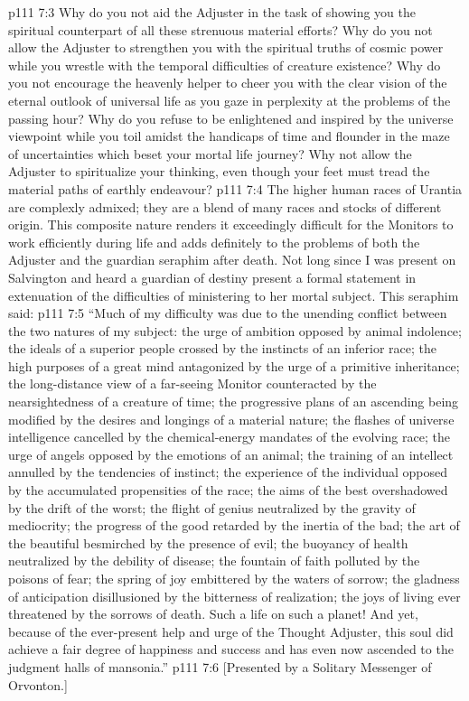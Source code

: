 \vs p111 7:3 Why do you not aid the Adjuster in the task of showing you the spiritual counterpart of all these strenuous material efforts? Why do you not allow the Adjuster to strengthen you with the spiritual truths of cosmic power while you wrestle with the temporal difficulties of creature existence? Why do you not encourage the heavenly helper to cheer you with the clear vision of the eternal outlook of universal life as you gaze in perplexity at the problems of the passing hour? Why do you refuse to be enlightened and inspired by the universe viewpoint while you toil amidst the handicaps of time and flounder in the maze of uncertainties which beset your mortal life journey? Why not allow the Adjuster to spiritualize your thinking, even though your feet must tread the material paths of earthly endeavour?
\vs p111 7:4 The higher human races of Urantia are complexly admixed; they are a blend of many races and stocks of different origin. This composite nature renders it exceedingly difficult for the Monitors to work efficiently during life and adds definitely to the problems of both the Adjuster and the guardian seraphim after death. Not long since I was present on Salvington and heard a guardian of destiny present a formal statement in extenuation of the difficulties of ministering to her mortal subject. This seraphim said:
\vs p111 7:5 \pc “Much of my difficulty was due to the unending conflict between the two natures of my subject: the urge of ambition opposed by animal indolence; the ideals of a superior people crossed by the instincts of an inferior race; the high purposes of a great mind antagonized by the urge of a primitive inheritance; the long\hyp{}distance view of a far\hyp{}seeing Monitor counteracted by the nearsightedness of a creature of time; the progressive plans of an ascending being modified by the desires and longings of a material nature; the flashes of universe intelligence cancelled by the chemical\hyp{}energy mandates of the evolving race; the urge of angels opposed by the emotions of an animal; the training of an intellect annulled by the tendencies of instinct; the experience of the individual opposed by the accumulated propensities of the race; the aims of the best overshadowed by the drift of the worst; the flight of genius neutralized by the gravity of mediocrity; the progress of the good retarded by the inertia of the bad; the art of the beautiful besmirched by the presence of evil; the buoyancy of health neutralized by the debility of disease; the fountain of faith polluted by the poisons of fear; the spring of joy embittered by the waters of sorrow; the gladness of anticipation disillusioned by the bitterness of realization; the joys of living ever threatened by the sorrows of death. Such a life on such a planet! And yet, because of the ever\hyp{}present help and urge of the Thought Adjuster, this soul did achieve a fair degree of happiness and success and has even now ascended to the judgment halls of mansonia.”
\vsetoff
\vs p111 7:6 [Presented by a Solitary Messenger of Orvonton.]
\quizlink
